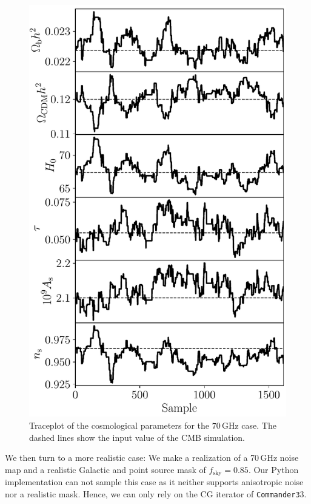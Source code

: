 \documentclass[twocolumn]{../common/aa}
\def\commanderthree{\texttt{Commander3}}
\begin{document}
\begin{figure}
	\centering
	\includegraphics[width=\linewidth]{figures/realistic_chain.pdf}
	\caption{\label{fig:traceplot}Traceplot of the cosmological parameters for the $70\,$GHz case. The dashed lines show the input value of the CMB simulation.}
\end{figure}

We then turn to a more realistic case: We make a realization of a 70\,GHz noise map and a realistic Galactic and point source mask of $f_{\mathrm{sky}}=0.85$. Our Python implementation can not sample this case as it neither supports anisotropic noise nor a realistic mask. Hence, we can only rely on the CG iterator of \commanderthree3.
\end{document}
